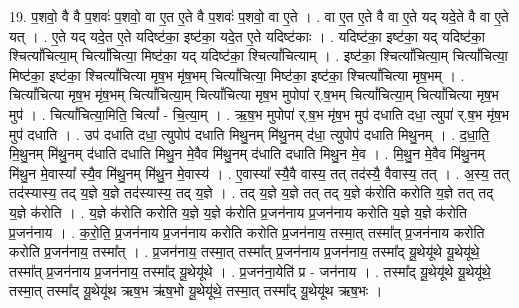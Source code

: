 \documentclass[17pt]{extarticle}
\begin{document}
19. प॒शवो॒ वै वै प॒शवः॑ प॒शवो॒ वा ए॒त ए॒ते वै प॒शवः॑ प॒शवो॒ वा ए॒ते । . वा ए॒त ए॒ते वै वा ए॒ते यद् यदे॒ते वै वा ए॒ते यत् । . ए॒ते यद् यदे॒त ए॒ते यदिष्ट॑का॒ इष्ट॑का॒ यदे॒त ए॒ते यदिष्ट॑काः । . यदिष्ट॑का॒ इष्ट॑का॒ यद् यदिष्ट॑का॒ श्चित्यां᳚चित्या॒म् चित्यां᳚चित्या॒ मिष्ट॑का॒ यद् यदिष्ट॑का॒ श्चित्यां᳚चित्याम् । . इष्ट॑का॒ श्चित्यां᳚चित्या॒म् चित्यां᳚चित्या॒ मिष्ट॑का॒ इष्ट॑का॒ श्चित्यां᳚चित्या मृष॒भ मृ॑ष॒भम् चित्यां᳚चित्या॒ मिष्ट॑का॒ इष्ट॑का॒ श्चित्यां᳚चित्या मृष॒भम् । . चित्यां᳚चित्या मृष॒भ मृ॑ष॒भम् चित्यां᳚चित्या॒म् चित्यां᳚चित्या मृष॒भ मुपोपा॑ र्.ष॒भम् चित्यां᳚चित्या॒म् चित्यां᳚चित्या मृष॒भ मुप॑ । . चित्यां᳚चित्या॒मिति॒ चित्यां᳚ - चि॒त्या॒म् । . ऋ॒ष॒भ मुपोपा॑ र्.ष॒भ मृ॑ष॒भ मुप॑ दधाति दधा॒ त्युपा॑ र्.ष॒भ मृ॑ष॒भ मुप॑ दधाति । . उप॑ दधाति दधा॒ त्युपोप॑ दधाति मिथु॒नम् मि॑थु॒नम् द॑धा॒ त्युपोप॑ दधाति मिथु॒नम् । . द॒धा॒ति॒ मि॒थु॒नम् मि॑थु॒नम् द॑धाति दधाति मिथु॒न मे॒वैव मि॑थु॒नम् द॑धाति दधाति मिथु॒न मे॒व । . मि॒थु॒न मे॒वैव मि॑थु॒नम् मि॑थु॒न मे॒वास्या᳚ स्यै॒व मि॑थु॒नम् मि॑थु॒न मे॒वास्य॑ । . ए॒वास्या᳚ स्यै॒वै वास्य॒ तत् तद॑स्यै॒ वैवास्य॒ तत् । . अ॒स्य॒ तत् तद॑स्यास्य॒ तद् य॒ज्ञे य॒ज्ञे तद॑स्यास्य॒ तद् य॒ज्ञे । . तद् य॒ज्ञे य॒ज्ञे तत् तद् य॒ज्ञे क॑रोति करोति य॒ज्ञे तत् तद् य॒ज्ञे क॑रोति । . य॒ज्ञे क॑रोति करोति य॒ज्ञे य॒ज्ञे क॑रोति प्र॒जन॑नाय प्र॒जन॑नाय करोति य॒ज्ञे य॒ज्ञे क॑रोति प्र॒जन॑नाय । . क॒रो॒ति॒ प्र॒जन॑नाय प्र॒जन॑नाय करोति करोति प्र॒जन॑नाय॒ तस्मा॒त् तस्मा᳚त् प्र॒जन॑नाय करोति करोति प्र॒जन॑नाय॒ तस्मा᳚त् । . प्र॒जन॑नाय॒ तस्मा॒त् तस्मा᳚त् प्र॒जन॑नाय प्र॒जन॑नाय॒ तस्मा᳚द् यू॒थेयू॑थे यू॒थेयू॑थे॒ तस्मा᳚त् प्र॒जन॑नाय प्र॒जन॑नाय॒ तस्मा᳚द् यू॒थेयू॑थे । . प्र॒जन॑ना॒येति॑ प्र - जन॑नाय । . तस्मा᳚द् यू॒थेयू॑थे यू॒थेयू॑थे॒ तस्मा॒त् तस्मा᳚द् यू॒थेयू॑थ ऋष॒भ ऋ॑ष॒भो यू॒थेयू॑थे॒ तस्मा॒त् तस्मा᳚द् यू॒थेयू॑थ ऋष॒भः । \newline
\end{document}
